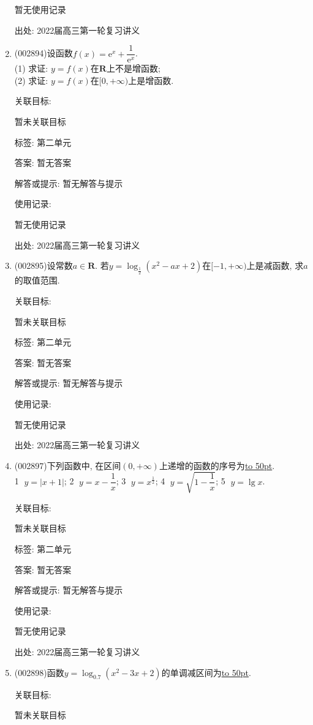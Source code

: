 \documentclass[10pt,a4paper]{article}
\newcommand{\blank}[1]{\underline{\hbox to #1pt{}}}
\begin{document}
\begin{enumerate}[1.]
暂无使用记录


出处: 2022届高三第一轮复习讲义
\item { (002894)}设函数$f(x)=\mathrm{e}^x+\dfrac 1{\mathrm{e}^x}$.\\
(1) 求证: $y=f(x)$在$\mathbf{R}$上不是增函数;\\
(2) 求证: $y=f(x)$在$[0,+\infty)$上是增函数.


关联目标:

暂未关联目标



标签: 第二单元

答案: 暂无答案

解答或提示: 暂无解答与提示

使用记录:

暂无使用记录


出处: 2022届高三第一轮复习讲义
\item { (002895)}设常数$a\in \mathbf{R}$. 若$y=\log_{\frac 12}(x^2-ax+2)$在$[-1,+\infty)$上是减函数, 求$a$的取值范围.


关联目标:

暂未关联目标



标签: 第二单元

答案: 暂无答案

解答或提示: 暂无解答与提示

使用记录:

暂无使用记录


出处: 2022届高三第一轮复习讲义
\item { (002897)}下列函数中, 在区间$(0 ,+\infty)$上递增的函数的序号为\blank{50}.\\
\textcircled{1} $y=|x+1|$;  \textcircled{2} $y=x-\dfrac 1x$;    \textcircled{3} $y={x^{\frac 12}}$;    \textcircled{4} $y=\sqrt{1-\dfrac 1x}$; \textcircled{5} $y=\lg x$.


关联目标:

暂未关联目标



标签: 第二单元

答案: 暂无答案

解答或提示: 暂无解答与提示

使用记录:

暂无使用记录


出处: 2022届高三第一轮复习讲义
\item { (002898)}函数$y=\log_{0.7}(x^2-3x+2)$的单调减区间为\blank{50}.


关联目标:

暂未关联目标




\end{enumerate}
\end{document}
